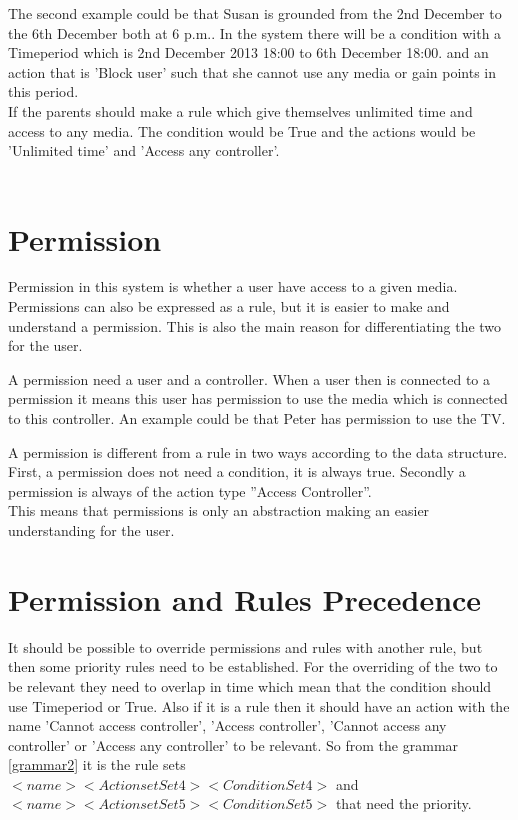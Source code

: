 The second example could be that Susan is grounded from the 2nd December to the 6th December both at 6 p.m.. In the system there will be a condition with a Timeperiod which is 2nd December 2013 18:00 to 6th December 18:00.
and an action that is 'Block user' such that she cannot use any media or gain points in this period. \\

If the parents should make a rule which give themselves unlimited time and access to any media. The condition would be True and the actions would be 'Unlimited time' and 'Access any controller'.\\\\  


\section{Permission}
Permission in this system is whether a user have access to a given media. Permissions can also be expressed as a rule, but it is easier to make and understand a permission. This is also the main reason for differentiating the two for the user. 

A permission need a user and a controller. When a user then is connected to a permission it means this user has permission to use the media which is connected to this controller. An example could be that Peter has permission to use the TV. 

A permission is different from a rule in two ways according to the data structure. First, a permission does not need a condition, it is always true. Secondly a permission is always of the action type ''Access Controller''.\\
This means that permissions is only an abstraction making an easier understanding for the user.


\section{Permission and Rules Precedence}
It should be possible to override permissions and rules with another rule, but then some priority rules  need to be established. 
For the overriding of the two to be relevant they need to overlap in time which mean that the condition should use Timeperiod or True. Also if it is a rule then it should have an action with the name 'Cannot access controller', 'Access controller', 'Cannot access any controller' or 'Access any controller' to be relevant. So from the grammar \ref{grammar2} it is the rule sets $<name> <ActionsetSet4><ConditionSet4>$  and $<name> <ActionsetSet5><ConditionSet5>$ that need the priority.

